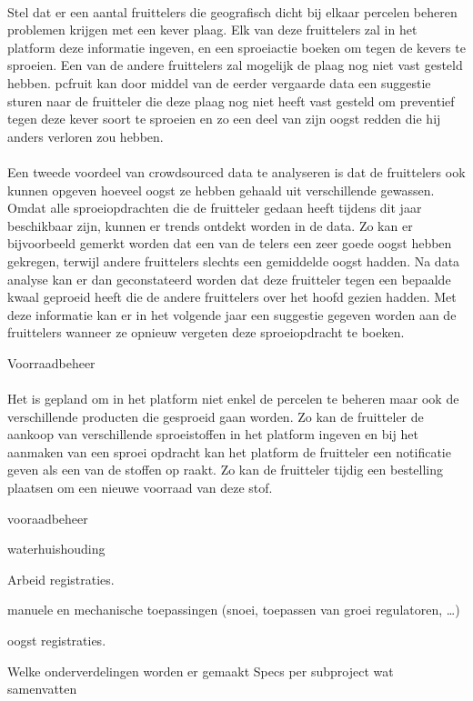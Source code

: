 \paragraph {} Stel dat er een aantal fruittelers die geografisch dicht bij elkaar percelen
beheren problemen krijgen met een kever plaag. Elk van deze fruittelers zal in het platform
deze informatie ingeven, en een sproeiactie boeken om tegen de kevers te sproeien. Een van
de andere fruittelers zal mogelijk de plaag nog niet vast gesteld hebben. pcfruit kan door
middel van de eerder vergaarde data een suggestie sturen naar de fruitteler die deze plaag nog
niet heeft vast gesteld om preventief tegen deze kever soort te sproeien en zo een deel
van zijn oogst redden die hij anders verloren zou hebben.

\paragraph {} Een tweede voordeel van crowdsourced data te analyseren is dat de fruittelers ook
kunnen opgeven hoeveel oogst ze hebben gehaald uit verschillende gewassen. Omdat alle
sproeiopdrachten die de fruitteler gedaan heeft tijdens dit jaar beschikbaar zijn, kunnen er
trends ontdekt worden in de data. Zo kan er bijvoorbeeld gemerkt worden dat een van de
telers een zeer goede oogst hebben gekregen, terwijl andere fruittelers slechts een gemiddelde
oogst hadden. Na data analyse kan er dan geconstateerd worden dat deze fruitteler tegen een
bepaalde kwaal geproeid heeft die de andere fruittelers over het hoofd gezien hadden. Met deze
informatie kan er in het volgende jaar een suggestie gegeven worden aan de fruittelers wanneer
ze opnieuw vergeten deze sproeiopdracht te boeken.

Voorraadbeheer

\paragraph {} Het is gepland om in het platform niet enkel de percelen te beheren maar ook de
verschillende producten die gesproeid gaan worden. Zo kan de fruitteler de aankoop van
verschillende sproeistoffen in het platform ingeven en bij het aanmaken van een sproei
opdracht kan het platform de fruitteler een notificatie geven als een van de stoffen op raakt.
Zo kan de fruitteler tijdig een bestelling plaatsen om een nieuwe voorraad van deze stof.

vooraadbeheer

waterhuishouding

Arbeid registraties.

manuele en mechanische toepassingen (snoei,  toepassen van groei regulatoren, …)

oogst registraties.


Welke onderverdelingen worden er gemaakt
Specs per subproject wat samenvatten


